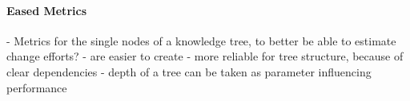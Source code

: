 %
%
%
%
%
%
%

\paragraph{Eased Metrics}
\label{eased_metrics_heading}

- Metrics for the single nodes of a knowledge tree, to better be able to estimate change efforts?
- are easier to create
- more reliable for tree structure, because of clear dependencies
- depth of a tree can be taken as parameter influencing performance
